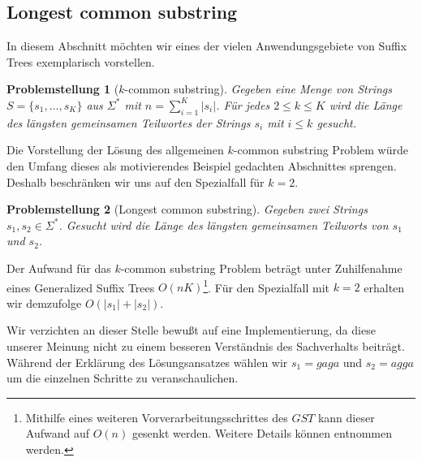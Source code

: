 \documentclass[12pt]{report}
\newtheorem*{problem}{Problemstellung}
\newcommand{\abs}[1]{\left|#1\right|}
\begin{document}
\subsection{Longest common substring}
\label{sec:LongestCommonSubstring}

In diesem Abschnitt möchten wir eines der vielen Anwendungsgebiete von Suffix Trees exemplarisch vorstellen.

\begin{problem}[$k$-common substring]
Gegeben eine Menge von Strings $S = \{s_1, \dots, s_K\}$ aus $\Sigma^*$ mit $n = \sum_{i = 1}^K \abs{s_i}$. Für jedes $2 \leq k \leq K$ wird die Länge des längsten gemeinsamen Teilwortes der Strings $s_i$ mit $i \leq k$ gesucht.
\end{problem}

Die Vorstellung der Lösung des allgemeinen $k$-common substring Problem würde den Umfang dieses als motivierendes Beispiel gedachten Abschnittes sprengen. Deshalb beschränken wir uns auf den Spezialfall für $k = 2$.

\begin{problem}[Longest common substring]
Gegeben zwei Strings $s_1, s_2 \in \Sigma^*$. Gesucht wird die Länge des längsten gemeinsamen Teilworts von $s_1$ und $s_2$.
\end{problem}

Der Aufwand für das $k$-common substring Problem beträgt unter Zuhilfenahme eines Generalized Suffix Trees $O(nK)$\footnote{Mithilfe eines weiteren Vorverarbeitungsschrittes des $GST$ kann dieser Aufwand auf $O(n)$ gesenkt werden. Weitere Details können \cite{Gusfield1997} entnommen werden.}. Für den Spezialfall mit $k = 2$ erhalten wir demzufolge $O(\abs{s_1} + \abs{s_2})$.

Wir verzichten an dieser Stelle bewußt auf eine Implementierung, da diese unserer Meinung nicht zu einem besseren Verständnis des Sachverhalts beiträgt.
Während der Erklärung des Lösungsansatzes wählen wir $s_1 = gaga$ und $s_2 = agga$ um die einzelnen Schritte zu veranschaulichen.
\end{document}
